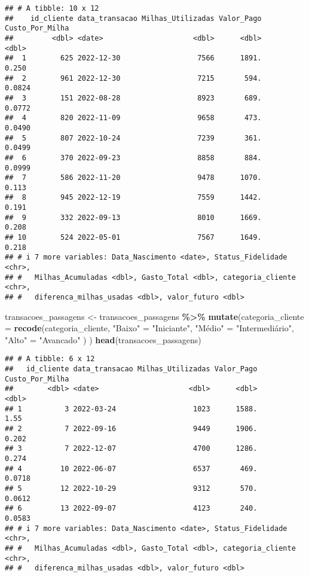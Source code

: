 \documentclass[
]{article}
\newenvironment{Shaded}{\begin{snugshade}}{\end{snugshade}}
\newcommand{\AttributeTok}[1]{\textcolor[rgb]{0.13,0.29,0.53}{#1}}
\newcommand{\FunctionTok}[1]{\textcolor[rgb]{0.13,0.29,0.53}{\textbf{#1}}}
\newcommand{\NormalTok}[1]{#1}
\newcommand{\OtherTok}[1]{\textcolor[rgb]{0.56,0.35,0.01}{#1}}
\newcommand{\SpecialCharTok}[1]{\textcolor[rgb]{0.81,0.36,0.00}{\textbf{#1}}}
\newcommand{\StringTok}[1]{\textcolor[rgb]{0.31,0.60,0.02}{#1}}
\begin{document}
\begin{verbatim}
## # A tibble: 10 x 12
##    id_cliente data_transacao Milhas_Utilizadas Valor_Pago Custo_Por_Milha
##         <dbl> <date>                     <dbl>      <dbl>           <dbl>
##  1        625 2022-12-30                  7566      1891.          0.250 
##  2        961 2022-12-30                  7215       594.          0.0824
##  3        151 2022-08-28                  8923       689.          0.0772
##  4        820 2022-11-09                  9658       473.          0.0490
##  5        807 2022-10-24                  7239       361.          0.0499
##  6        370 2022-09-23                  8858       884.          0.0999
##  7        586 2022-11-20                  9478      1070.          0.113 
##  8        945 2022-12-19                  7559      1442.          0.191 
##  9        332 2022-09-13                  8010      1669.          0.208 
## 10        524 2022-05-01                  7567      1649.          0.218 
## # i 7 more variables: Data_Nascimento <date>, Status_Fidelidade <chr>,
## #   Milhas_Acumuladas <dbl>, Gasto_Total <dbl>, categoria_cliente <chr>,
## #   diferenca_milhas_usadas <dbl>, valor_futuro <dbl>
\end{verbatim}

\begin{Shaded}
\begin{Highlighting}[]
\NormalTok{transacoes\_passagens }\OtherTok{\textless{}{-}}\NormalTok{ transacoes\_passagens }\SpecialCharTok{\%\textgreater{}\%} 
  \FunctionTok{mutate}\NormalTok{(}\AttributeTok{categoria\_cliente =} 
    \FunctionTok{recode}\NormalTok{(categoria\_cliente,}
          \StringTok{"Baixo"} \OtherTok{=} \StringTok{"Iniciante"}\NormalTok{,}
          \StringTok{"Médio"} \OtherTok{=} \StringTok{"Intermediário"}\NormalTok{,}
          \StringTok{"Alto"} \OtherTok{=} \StringTok{"Avancado"}
\NormalTok{  )}
\NormalTok{)}
\FunctionTok{head}\NormalTok{(transacoes\_passagens)}
\end{Highlighting}
\end{Shaded}

\begin{verbatim}
## # A tibble: 6 x 12
##   id_cliente data_transacao Milhas_Utilizadas Valor_Pago Custo_Por_Milha
##        <dbl> <date>                     <dbl>      <dbl>           <dbl>
## 1          3 2022-03-24                  1023      1588.          1.55  
## 2          7 2022-09-16                  9449      1906.          0.202 
## 3          7 2022-12-07                  4700      1286.          0.274 
## 4         10 2022-06-07                  6537       469.          0.0718
## 5         12 2022-10-29                  9312       570.          0.0612
## 6         13 2022-09-07                  4123       240.          0.0583
## # i 7 more variables: Data_Nascimento <date>, Status_Fidelidade <chr>,
## #   Milhas_Acumuladas <dbl>, Gasto_Total <dbl>, categoria_cliente <chr>,
## #   diferenca_milhas_usadas <dbl>, valor_futuro <dbl>
\end{verbatim}
\end{document}
